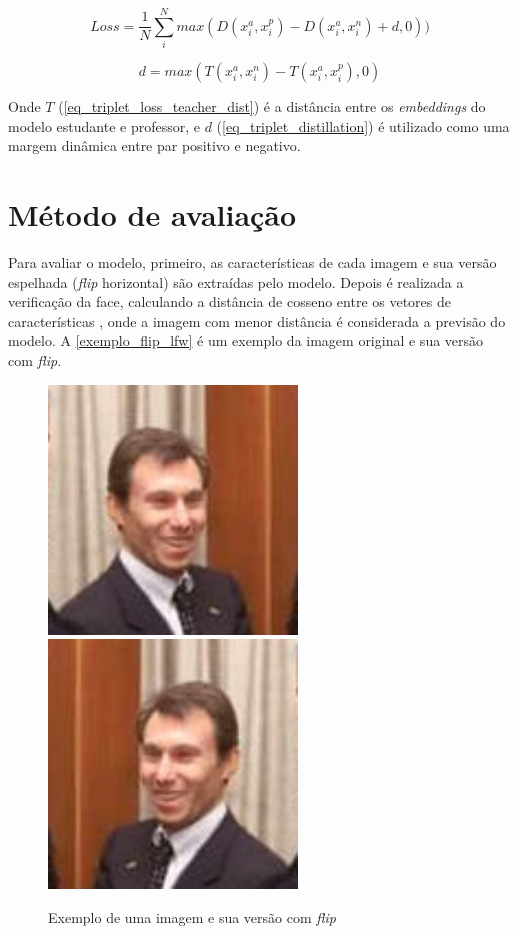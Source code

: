 \begin{equation}\label{eq_triplet_distillation}
	Loss = \frac 1 N \sum _i ^N max(D(x_i^a, x_i^p) - D(x_i^a, x_i^n) + d, 0))
\end{equation}

\begin{equation}\label{eq_triplet_loss_teacher_dist}
	d = max(T(x_i^a, x_i^n) - T(x_i^a, x_i^p), 0)
\end{equation}

Onde $T$ (\ref{eq_triplet_loss_teacher_dist}) é a distância entre os \textit{embeddings} do modelo estudante e
professor, e $d$ (\ref{eq_triplet_distillation}) é utilizado como uma margem dinâmica entre par positivo e negativo.


\section{Método de avaliação}\label{sec_avaliacao_modelo}
Para avaliar o modelo, primeiro, as características de cada imagem e sua versão espelhada
(\textit{flip} horizontal) são extraídas pelo modelo.
Depois é realizada a verificação da face, calculando a distância de cosseno entre os vetores de características
\cite{triplet_distillation_face_recognition}, onde a imagem com menor distância é considerada a previsão do
modelo. A \autoref{exemplo_flip_lfw} é um exemplo da imagem original e sua versão com \textit{flip}.

\begin{figure}[htb]
	\begin{center}
		\includegraphics[scale=0.5]{Imagens/exemplo_flip_01}
		\includegraphics[scale=0.5]{Imagens/exemplo_flip_02}
	\end{center}
	\caption {\label{exemplo_flip_lfw}Exemplo de uma imagem e sua versão com \textit{flip}} 
\end{figure}

